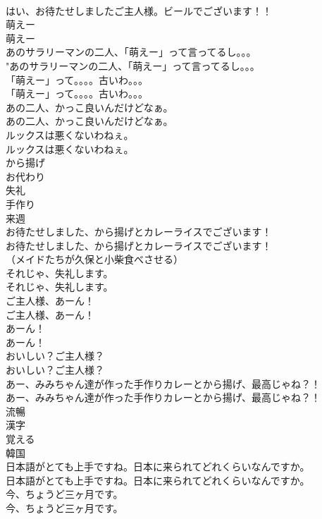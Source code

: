 \documentclass[8pt]{extreport}
\begin{document}
\begin{CJK}{UTF8}{min}
\\	はい、お待たせしましたご主人様。ビールでございます！！ 
\\	萌えー	
\\	萌えー 
\\	あのサラリーマンの二人、「萌えー」って言ってるし。。。	
\\	"あのサラリーマンの二人、「萌えー」って言ってるし。。。 
\\	「萌えー」って。。。。古いわ。。。	
\\	「萌えー」って。。。。古いわ。。。 
\\	あの二人、かっこ良いんだけどなぁ。	
\\	あの二人、かっこ良いんだけどなぁ。 
\\	ルックスは悪くないわねぇ。	
\\	ルックスは悪くないわねぇ。 
\\	から揚げ
\\	お代わり
\\	失礼
\\	手作り
\\	来週
\\	お待たせしました、から揚げとカレーライスでございます！	
\\	お待たせしました、から揚げとカレーライスでございます！ 
\\	（メイドたちが久保と小柴食べさせる）	
\\	それじゃ、失礼します。	
\\	それじゃ、失礼します。 
\\	ご主人様、あーん！	
\\	ご主人様、あーん！ 
\\	あーん！	
\\	あーん！ 
\\	おいしい？ご主人様？	
\\	おいしい？ご主人様？ 
\\	あー、みみちゃん達が作った手作りカレーとから揚げ、最高じゃね？！	
\\	あー、みみちゃん達が作った手作りカレーとから揚げ、最高じゃね？！ 
\\	流暢
\\	漢字
\\	覚える
\\	韓国
\\	日本語がとても上手ですね。日本に来られてどれくらいなんですか。	
\\	日本語がとても上手ですね。日本に来られてどれくらいなんですか。 
\\	今、ちょうど三ヶ月です。	
\\	今、ちょうど三ヶ月です。 

\end{CJK}
\end{document}
